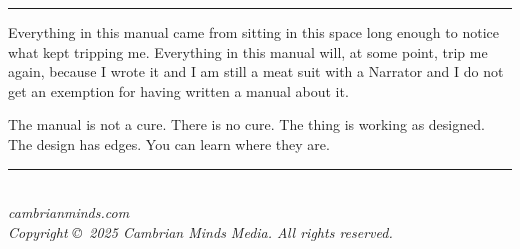 \documentclass[11pt, letterpaper]{article}
\begin{document}

\textcolor{coldgray}{\rule{\textwidth}{0.3pt}}

Everything in this manual came from sitting in this space long enough to notice what kept tripping me. Everything in this manual will, at some point, trip me again, because I wrote it and I am still a meat suit with a Narrator and I do not get an exemption for having written a manual about it.

The manual is not a cure. There is no cure. The thing is working as designed. The design has edges. You can learn where they are.

\vspace{1em}
\begin{center}
\textcolor{coldgray}{\rule{0.4\textwidth}{0.3pt}}\\[0.5em]
{\small\textit{cambrianminds.com}}\\[0.3em]
{\small\textit{Copyright \copyright\ 2025 Cambrian Minds Media. All rights reserved.}}
\end{center}
\end{document}
